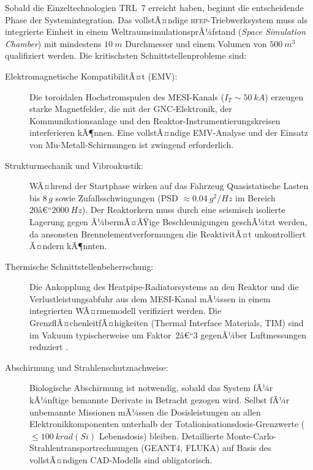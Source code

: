 ﻿\documentclass[a4paper,12pt,twoside]{article}
\theoremstyle{plain}
\theoremstyle{definition}
\theoremstyle{remark}
\newcommand{\HFEP}{\textsc{hfep}}
\begin{document}
	Sobald die Einzeltechnologien TRL~7 erreicht haben, beginnt die entscheidende Phase
	der Systemintegration. Das vollstÃ¤ndige \HFEP-Triebwerksystem muss als integrierte
	Einheit in einem Weltraumsimulations\-prÃ¼fstand (\emph{Space Simulation Chamber})
	mit mindestens $\SI{10}{m}$ Durchmesser und einem Volumen von $\SI{500}{m^3}$
	qualifiziert werden. Die kritischsten Schnittstellenprobleme sind:

	\begin{description}
		\item[Elektro\-magnetische KompatibilitÃ¤t (EMV):]
		Die toroidalen Hochstromspulen des MESI-Kanals ($I_T \sim\SI{50}{kA}$)
		erzeugen starke Magnetfelder, die mit der GNC-Elektronik, der Kommunikationsanlage
		und den Reaktor-Instrumentierungskreisen interferieren kÃ¶nnen. Eine vollstÃ¤ndige
		EMV-Analyse und der Einsatz von Mu-Metall-Schirmungen ist zwingend erforderlich.

		\item[Strukturmechanik und Vibroakustik:]
		WÃ¤hrend der Startphase wirken auf das Fahrzeug Quasistatische Lasten bis
		$8\,g$ sowie Zufallsschwingungen (PSD $\approx\SI{0.04}{g^2/Hz}$ im Bereich
		$20\text{â€“}\SI{2000}{Hz}$). Der Reaktorkern muss durch eine seismisch isolierte
		Lagerung gegen Ã¼ber\-mÃ¤ÃŸige Beschleunigungen geschÃ¼tzt werden, da ansonsten
		Brennelementverformungen die ReaktivitÃ¤t unkontrolliert Ã¤ndern kÃ¶nnten.

		\item[Thermische Schnittstellenbeherrschung:]
		Die Ankopplung des Heatpipe-Radiatorsys\-tems an den Reaktor und die
		Verlustleistungsabfuhr aus dem MESI-Kanal mÃ¼ssen in einem integrierten
		WÃ¤rmemodell verifiziert werden. Die GrenzflÃ¤chenleitfÃ¤higkeiten (Thermal
		Interface Materials, TIM) sind im Vakuum typischerweise um Faktor~2â€“3
		gegenÃ¼ber Luftmessungen reduziert \cite{gilmore2002}.

		\item[Abschirmung und Strahlenschutznachweise:]
		Biologische Abschirmung ist notwendig, sobald das System fÃ¼r kÃ¼nftige
		bemannte Derivate in Betracht gezogen wird. Selbst fÃ¼r unbemannte Missionen
		mÃ¼ssen die Dosisleistungen an allen Elektronikkomponenten unterhalb der
		Totalionisationsdosis-Grenzwerte ($\leq\SI{100}{krad(Si)}$ Lebensdosis)
		bleiben. Detaillierte Monte-Carlo-Strahlentransportrechnungen (GEANT4,
		FLUKA) auf Basis des vollstÃ¤ndigen CAD-Modells sind obligatorisch.
	\end{description}
\end{document}
